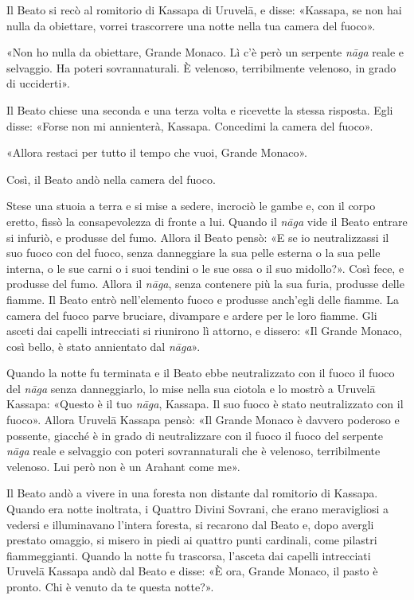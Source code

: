 Il Beato si recò al romitorio di Kassapa di Uruvelā, e disse: «Kassapa, se non
hai nulla da obiettare, vorrei trascorrere una notte nella tua camera del
fuoco».

«Non ho nulla da obiettare, Grande Monaco. Lì c’è però un serpente \emph{nāga}
reale e selvaggio. Ha poteri sovrannaturali. È velenoso, terribilmente velenoso,
in grado di ucciderti».

Il Beato chiese una seconda e una terza volta e ricevette la stessa risposta.
Egli disse: «Forse non mi annienterà, Kassapa. Concedimi la camera del fuoco».

«Allora restaci per tutto il tempo che vuoi, Grande Monaco».

Così, il Beato andò nella camera del fuoco.

Stese una stuoia a terra e si mise a sedere, incrociò le gambe e, con il corpo
eretto, fissò la consapevolezza di fronte a lui. Quando il \emph{nāga} vide il
Beato entrare si infuriò, e produsse del fumo. Allora il Beato pensò: «E se io
neutralizzassi il suo fuoco con del fuoco, senza danneggiare la sua pelle
esterna o la sua pelle interna, o le sue carni o i suoi tendini o le sue ossa o
il suo midollo?». Così fece, e produsse del fumo. Allora il \emph{nāga}, senza
contenere più la sua furia, produsse delle fiamme. Il Beato entrò nell’elemento
fuoco e produsse anch’egli delle fiamme. La camera del fuoco parve bruciare,
divampare e ardere per le loro fiamme. Gli asceti dai capelli intrecciati si
riunirono lì attorno, e dissero: «Il Grande Monaco, così bello, è stato
annientato dal \emph{nāga}».

Quando la notte fu terminata e il Beato ebbe neutralizzato con il fuoco il fuoco
del \emph{nāga} senza danneggiarlo, lo mise nella sua ciotola e lo mostrò a
Uruvelā Kassapa: «Questo è il tuo \emph{nāga}, Kassapa. Il suo fuoco è stato
neutralizzato con il fuoco». Allora Uruvelā Kassapa pensò: «Il Grande Monaco è
davvero poderoso e possente, giacché è in grado di neutralizzare con il fuoco il
fuoco del serpente \emph{nāga} reale e selvaggio con poteri sovrannaturali che è
velenoso, terribilmente velenoso. Lui però non è un Arahant come me».

Il Beato andò a vivere in una foresta non distante dal romitorio di Kassapa.
Quando era notte inoltrata, i Quattro Divini Sovrani, che erano meravigliosi a
vedersi e illuminavano l’intera foresta, si recarono dal Beato e, dopo avergli
prestato omaggio, si misero in piedi ai quattro punti cardinali, come pilastri
fiammeggianti. Quando la notte fu trascorsa, l’asceta dai capelli intrecciati
Uruvelā Kassapa andò dal Beato e disse: «È ora, Grande Monaco, il pasto è
pronto. Chi è venuto da te questa notte?».


